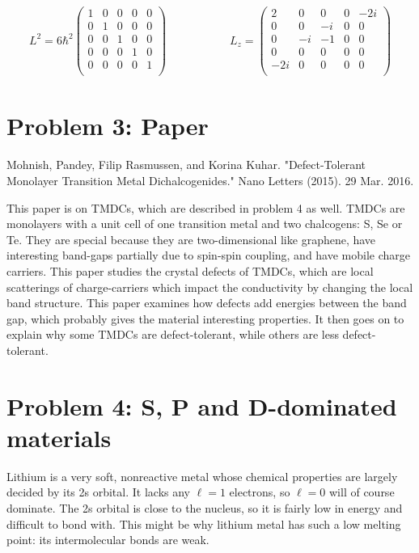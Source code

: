 \documentclass[10pt]{article} %
\begin{document}
\begin{align*}
  L^2 =
  6\hbar^2\begin{pmatrix}
    1 & 0 & 0 & 0 & 0\\
    0 & 1 & 0 & 0 & 0\\
    0 & 0 & 1 & 0 & 0\\
    0 & 0 & 0 & 1 & 0\\
    0 & 0 & 0 & 0 & 1\\
  \end{pmatrix}&
  \hspace{2cm}
  L_z =
  \begin{pmatrix}
   2 & 0 & 0 & 0 & -2i\\
   0 & 0 & -i & 0 & 0\\
   0 & -i & -1 & 0 & 0\\
   0 & 0 & 0 & 0 & 0\\
   -2i & 0 & 0 & 0 & 0\\
  \end{pmatrix}
\end{align*}

\section{Problem 3: Paper}
Mohnish, Pandey, Filip Rasmussen, and Korina Kuhar. "Defect-Tolerant Monolayer
Transition Metal Dichalcogenides." Nano Letters (2015). 29 Mar. 2016.

This paper is on TMDCs, which are described in problem 4 as well. TMDCs are
monolayers with a unit cell of one transition metal and two chalcogens: S, Se
or Te. They are special because they are two-dimensional like graphene, have
interesting band-gaps partially due to spin-spin coupling, and have mobile
charge carriers. This paper studies the crystal defects of TMDCs, which are local
scatterings of charge-carriers which impact the conductivity by changing the
local band structure. This paper examines how defects add energies between
the band gap, which probably gives the material interesting properties. It then
goes on to explain why some TMDCs are defect-tolerant, while others are less
defect-tolerant.\\

\section{Problem 4: S, P and D-dominated materials}
Lithium is a very soft, nonreactive metal whose chemical properties are largely
decided by its 2s orbital. It lacks any $\ell=1$ electrons, so $\ell=0$ will of
course dominate. The 2s orbital is close to the nucleus, so it is fairly low
in energy and difficult to bond with. This might be why lithium metal has such
a low melting point: its intermolecular bonds are weak.\\
\end{document}
